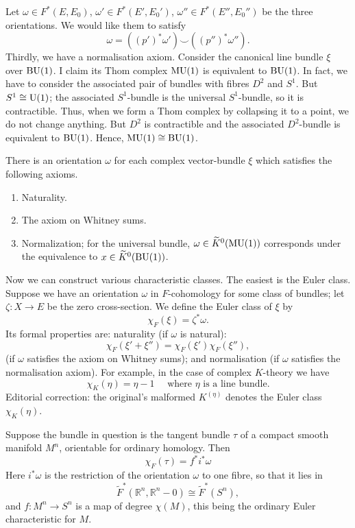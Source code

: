 \documentclass[../main]{subfiles}
\begin{document}
Let $\omega\in F^\ast (E,E_0)$, $\omega'\in F^\ast (E',E_0')$, $\omega''\in F^\ast (E'',E_0'')$ be the three orientations. We would like them to satisfy
\[\omega = ((p')^\ast \omega')\smile ((p'')^\ast \omega'').\]
Thirdly, we have a normalisation axiom. Consider the canonical line bundle $\xi$ over $\mathrm{BU}(1)$. I claim its Thom complex $\mathrm{MU}(1)$ is equivalent to $\mathrm{BU}(1)$. In fact, we have to consider the associated pair of bundles with fibres $D^2$ and $S^1$. But $S^1\cong \mathrm{U}(1)$; the associated $S^1$-bundle is the universal $S^1$-bundle, so it is contractible. Thus, when we form a Thom complex by collapsing it to a point, we do not change anything. But $D^2$ is contractible and the associated $D^2$-bundle is equivalent to $\mathrm{BU}(1)$. Hence, $\mathrm{MU}(1)\cong \mathrm{BU}(1)$.
\begin{proposition}\label{prop:p3ch11.3}
There is an orientation $\omega$ for each complex vector-bundle $\xi$ which satisfies the following axioms.
\begin{enumerate}
    \item Naturality.
    \item The axiom on Whitney sums.
    \item Normalization; for the universal bundle, $\omega \in \widetilde{K}^0(\mathrm{MU}(1))$ corresponds under the equivalence to $x\in \widetilde{K}^0(\mathrm{BU}(1))$. 
\end{enumerate}
\end{proposition}
\par Now we can construct various characteristic classes. The easiest is the Euler class. Suppose we have an orientation $\omega$ in $F$-cohomology for some class of bundles; let $\zeta:X\longrightarrow E$ be the zero cross-section. We define the Euler class of $\xi$ by
\[\chi_F(\xi)=\zeta^\ast \omega.\]
Its formal properties are: naturality (if $\omega$ is natural):
\[\chi_F(\xi'+\xi'')=\chi_F(\xi')\chi_F(\xi''),\]
(if $\omega$ satisfies the axiom on Whitney sums); and normalisation (if $\omega$ satisfies the normalisation axiom). For example, in the case of complex $K$-theory we have \[\chi_K(\eta)=\eta-1 \quad \text{ where } \eta \text{ is a line bundle.} \]
\noindent Editorial correction: the original's malformed $K^{(\eta)}$ denotes the Euler class $\chi_K(\eta)$.
\begin{proposition}\label{prop:p3ch11.4}
Suppose the bundle in question is the tangent bundle $\tau$ of a compact smooth manifold $M^n$, orientable for ordinary homology. Then
\[\chi_F(\tau)=f^\ast i^\ast \omega\]
Here $i^\ast \omega$ is the restriction of the orientation $\omega$ to one fibre, so that it lies in 
\[\tilde{F}^\ast (\mathbb{R}^n, \mathbb{R}^n-0)\cong \tilde{F}^\ast (S^n),\]
and $f:M^n\longrightarrow S^n$ is a map of degree $\chi(M)$, this being the ordinary Euler characteristic for $M$.
\end{proposition}
\end{document}

